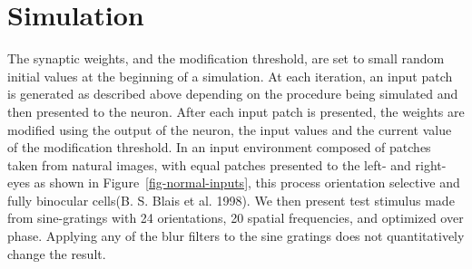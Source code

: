 \documentclass[
  letterpaper,
  DIV=11,
  numbers=noendperiod]{scrreprt}
\begin{document}
\hypertarget{simulation}{%
\section{Simulation}\label{simulation}}

The synaptic weights, and the modification threshold, are set to small
random initial values at the beginning of a simulation. At each
iteration, an input patch is generated as described above depending on
the procedure being simulated and then presented to the neuron. After
each input patch is presented, the weights are modified using the output
of the neuron, the input values and the current value of the
modification threshold. In an input environment composed of patches
taken from natural images, with equal patches presented to the left- and
right-eyes as shown in Figure~\ref{fig-normal-inputs}, this process
orientation selective and fully binocular cells(B. S. Blais et al.
1998). We then present test stimulus made from sine-gratings with 24
orientations, 20 spatial frequencies, and optimized over phase. Applying
any of the blur filters to the sine gratings does not quantitatively
change the result.
\end{document}
